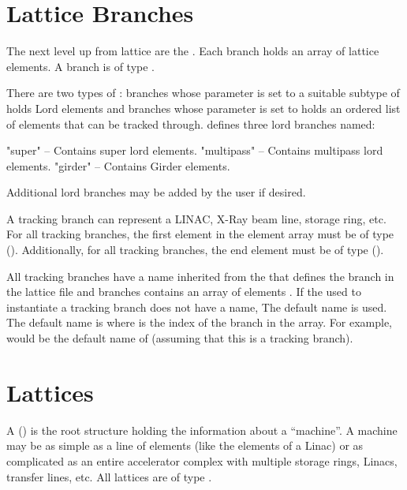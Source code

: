 \section{Lattice Branches}
\label{s:branch.def}

The next level up from lattice  are the .
Each branch holds an array of lattice elements. 
A branch is of type . 

There are two types of : branches whose  parameter is set to
a suitable subtype of  holds Lord elements and 
branches whose  parameter is set to  holds an ordered
list of elements that can be tracked through. \accellat defines three lord branches named:
\begin{example}
  "super"       -- Contains super lord elements.
  "multipass"   -- Contains multipass lord elements.
  "girder"      -- Contains Girder elements.
\end{example}
Additional lord branches may be added by the user if desired.

A tracking branch can represent a LINAC, X-Ray beam line, storage ring, etc.
For all tracking branches, the first element in the element array
must be of type  ().
Additionally, for all tracking branches, 
the end element must be of type  ().

All tracking branches have a name  inherited from the  that defines
the branch in the lattice file and branches contains an array of elements .
If the  used to instantiate a tracking branch does not have a name, The default name
is used. The default name is  where  is the index of the
branch in the  array. For example,  would be the default name of 
 (assuming that this is a tracking branch).

\section{Lattices}
\label{s:lattice.def}

A  () is the root structure holding the information about a
``machine''. A machine may be as simple as a line of elements (like the elements of a Linac) or
as complicated as an entire accelerator complex with multiple storage rings, Linacs, transfer
lines, etc. All lattices are of type .

